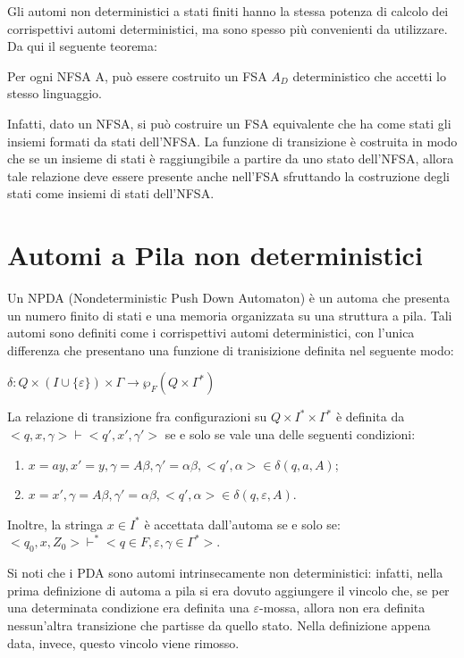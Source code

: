   Gli automi non deterministici a stati finiti hanno la stessa potenza di calcolo dei corrispettivi automi deterministici, ma sono spesso più convenienti da utilizzare. Da qui il seguente teorema:

  \begin{theorem}
    Per ogni NFSA A, può essere costruito un FSA \(A_D\) deterministico che accetti lo stesso linguaggio. 
  \end{theorem}

  Infatti, dato un NFSA, si può costruire un FSA equivalente che ha come stati gli insiemi formati da stati dell'NFSA. La funzione di transizione è costruita in modo che se un insieme di stati è raggiungibile a partire da uno stato dell'NFSA, allora tale relazione deve essere presente anche nell'FSA sfruttando la costruzione degli stati come insiemi di stati dell'NFSA. 

  \vspace{1in}
  \section{Automi a Pila non deterministici}
  Un NPDA (Nondeterministic Push Down Automaton) è un automa che presenta un numero finito di stati  e una memoria organizzata su una struttura a pila. Tali automi sono definiti come i corrispettivi automi deterministici, con l'unica differenza che presentano una funzione di tranisizione definita nel seguente modo:

  \(\delta:Q\times (I\cup \{\varepsilon\})\times \Gamma \to \wp_F(Q\times\Gamma^*)\)

  La relazione di transizione fra configurazioni su \(Q\times I^*\times \Gamma^*\) è definita da \(<q,x,\gamma> \vdash <q',x',\gamma'>\) se e solo se vale una delle seguenti condizioni:
  \begin{enumerate}
    \item \(x=ay, x'=y, \gamma=A\beta, \gamma'=\alpha\beta, <q',\alpha>\in\delta(q, a, A)\);
    \item \(x=x', \gamma=A\beta, \gamma'=\alpha\beta, <q',\alpha>\in \delta(q,\varepsilon,A)\).
  \end{enumerate}  

  \noindent
  Inoltre, la stringa \(x\in I^*\) è accettata dall'automa se e solo se:\\
  \(<q_0, x,Z_0>\vdash^*<q\in F, \varepsilon, \gamma\in \Gamma^*>\).

  Si noti che i PDA sono automi intrinsecamente non deterministici: infatti, nella prima definizione di automa a pila si era dovuto aggiungere il vincolo che, se per una determinata condizione era definita una \(\varepsilon\)-mossa, allora non era definita nessun'altra transizione che partisse da quello stato. Nella definizione appena data, invece, questo vincolo viene rimosso.

